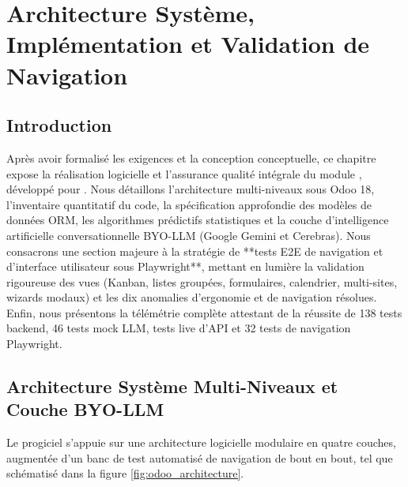 \chapter{Architecture Système, Implémentation et Validation de Navigation}
\label{chap:realization}

\section{Introduction}
Après avoir formalisé les exigences et la conception conceptuelle, ce chapitre expose la réalisation logicielle et l'assurance qualité intégrale du module \textbf{\odooModule}, développé pour \textbf{\companyName}. Nous détaillons l'architecture multi-niveaux sous Odoo 18, l'inventaire quantitatif du code, la spécification approfondie des modèles de données ORM, les algorithmes prédictifs statistiques et la couche d'intelligence artificielle conversationnelle BYO-LLM (Google Gemini et Cerebras). Nous consacrons une section majeure à la stratégie de **tests E2E de navigation et d'interface utilisateur sous Playwright**, mettant en lumière la validation rigoureuse des vues (Kanban, listes groupées, formulaires, calendrier, multi-sites, wizards modaux) et les dix anomalies d'ergonomie et de navigation résolues. Enfin, nous présentons la télémétrie complète attestant de la réussite de 138 tests backend, 46 tests mock LLM, tests live d'API et 32 tests de navigation Playwright.

\section{Architecture Système Multi-Niveaux et Couche BYO-LLM}
Le progiciel s'appuie sur une architecture logicielle modulaire en quatre couches, augmentée d'un banc de test automatisé de navigation de bout en bout, tel que schématisé dans la figure \ref{fig:odoo_architecture}.

